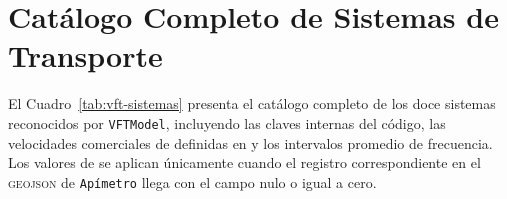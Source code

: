 
\section{Catálogo Completo de Sistemas de Transporte}
\label{anx:vft-catalogo}

El Cuadro~\ref{tab:vft-sistemas} presenta el catálogo completo de los doce
sistemas reconocidos por \texttt{VFTModel}, incluyendo las claves internas del código,
las velocidades comerciales de  definidas en
 y los intervalos promedio de frecuencia. Los
valores de  se aplican únicamente cuando el registro
correspondiente en el \textsc{geojson} de \texttt{Apímetro} llega con el campo nulo o
igual a cero.

